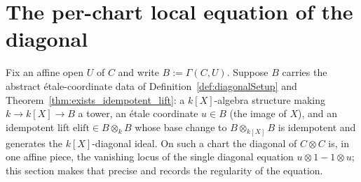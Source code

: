 \section{The per-chart local equation of the diagonal}

Fix an affine open \(U\) of \(C\) and write \(B := \Gamma(C, U)\). Suppose \(B\) carries the
abstract \'etale-coordinate data of Definition~\ref{def:diagonalSetup} and
Theorem~\ref{thm:exists_idempotent_lift}: a \(k[X]\)-algebra structure making \(k \to k[X] \to B\)
a tower, an \'etale coordinate \(u \in B\) (the image of \(X\)), and an idempotent lift
\(\mathrm{elift} \in B \otimes_k B\) whose base change to \(B \otimes_{k[X]} B\) is idempotent and
generates the \(k[X]\)-diagonal ideal. On such a chart the diagonal of \(C \otimes C\) is, in one
affine piece, the vanishing locus of the single diagonal equation \(u \otimes 1 - 1 \otimes u\);
this section makes that precise and records the regularity of the equation.

